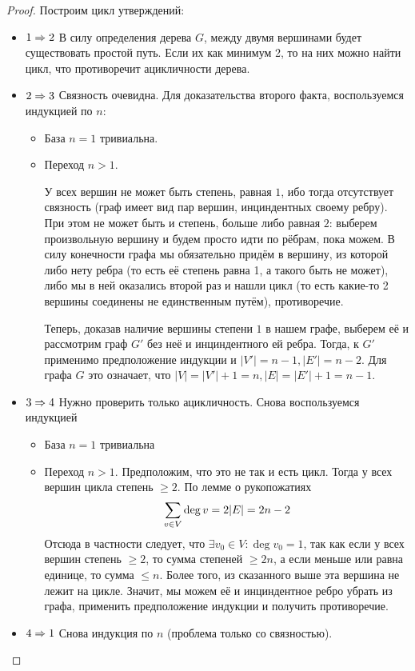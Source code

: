 \begin{proof}
	Построим цикл утверждений:
	\begin{itemize}
		\item $1 \Rightarrow 2$ В силу определения дерева $G$, между двумя вершинами будет существовать простой путь. Если их как минимум 2, то на них можно найти цикл, что противоречит ацикличности дерева.
		
		\item $2 \Rightarrow 3$ Связность очевидна. Для доказательства второго факта, воспользуемся индукцией по $n$:
		\begin{itemize}
			\item База $n = 1$ тривиальна.
			
			\item Переход $n > 1$.
			
			У всех вершин не может быть степень, равная $1$, ибо тогда отсутствует связность (граф имеет вид пар вершин, инциндентных своему ребру). При этом не может быть и степень, больше либо равная $2$: выберем произвольную вершину и будем просто идти по рёбрам, пока можем. В силу конечности графа мы обязательно придём в вершину, из которой либо нету ребра (то есть её степень равна 1, а такого быть не может), либо мы в ней оказались второй раз и нашли цикл (то есть какие-то 2 вершины соединены не единственным путём), противоречие.
			
			Теперь, доказав наличие вершины степени $1$ в нашем графе, выберем её и рассмотрим граф $G'$ без неё и инциндентного ей ребра. Тогда, к $G'$ применимо предположение индукции и $|V'| = n - 1, |E'| = n - 2$. Для графа $G$ это означает, что $|V| = |V'| + 1 = n, |E| = |E'| + 1 = n - 1$.
		\end{itemize}
	
		\item $3 \Rightarrow 4$ Нужно проверить только ацикличность. Снова воспользуемся индукцией
		\begin{itemize}
			\item База $n = 1$ тривиальна
			
			\item Переход $n > 1$. Предположим, что это не так и есть цикл. Тогда у всех вершин цикла степень $\ge 2$. По лемме о рукопожатиях
			\[
				\sum\limits_{v \in V} \deg v = 2|E| = 2n - 2
			\]
			Отсюда в частности следует, что $\exists v_0 \in V \colon \deg v_0 = 1$, так как если у всех вершин степень $\ge 2$, то сумма степеней $\ge 2n$, а если меньше или равна единице, то сумма $\le n$. Более того, из сказанного выше эта вершина не лежит на цикле. Значит, мы можем её и инциндентное ребро убрать из графа, применить предположение индукции и получить противоречие.
		\end{itemize}

		\item $4 \Rightarrow 1$ Снова индукция по $n$ (проблема только со связностью).
	\end{itemize}
\end{proof}

